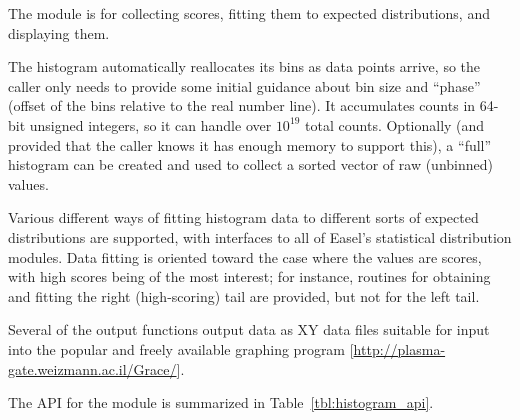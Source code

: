 
The  module is for collecting scores, fitting
them to expected distributions, and displaying them.

The histogram automatically reallocates its bins as data points
arrive, so the caller only needs to provide some initial guidance
about bin size and ``phase'' (offset of the bins relative to the real
number line).  It accumulates counts in 64-bit unsigned integers, so
it can handle over $10^19$ total counts.  Optionally (and provided
that the caller knows it has enough memory to support this), a
``full'' histogram can be created and used to collect a sorted vector
of raw (unbinned) values.

Various different ways of fitting histogram data to different sorts of
expected distributions are supported, with interfaces to all of
Easel's statistical distribution modules. Data fitting is oriented
toward the case where the values are scores, with high scores being of
the most interest; for instance, routines for obtaining and fitting
the right (high-scoring) tail are provided, but not for the left tail.

Several of the output functions output data as XY data files suitable
for input into the popular and freely available 
graphing program [\url{http://plasma-gate.weizmann.ac.il/Grace/}].

The API for the  module is summarized in
Table~\ref{tbl:histogram_api}.


